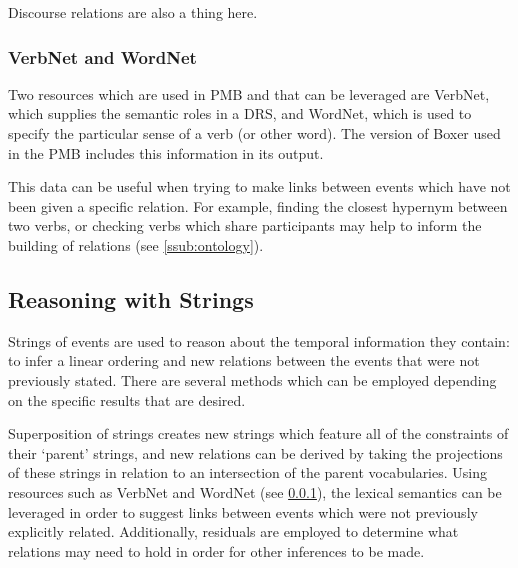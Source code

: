 \documentclass[a4paper,12pt,leqno]{article}
\begin{document}
Discourse relations are also a thing here.

\subsubsection{VerbNet and WordNet}\label{ssub:verbwordnet}
Two resources which are used in PMB and that can be leveraged are VerbNet, which supplies the semantic roles in a DRS, and WordNet, which is used to specify the particular sense of a verb (or other word). The version of Boxer used in the PMB includes this information in its output.

This data can be useful when trying to make links between events which have not been given a specific relation. For example, finding the closest hypernym between two verbs, or checking verbs which share participants may help to inform the building of relations (see \cref{ssub:ontology}).

\subsection{Reasoning with Strings}\label{sub:reasoning}
Strings of events are used to reason about the temporal information they contain: to infer a linear ordering and new relations between the events that were not previously stated. There are several methods which can be employed depending on the specific results that are desired.

Superposition of strings creates new strings which feature all of the constraints of their `parent' strings, and new relations can be derived by taking the projections of these strings in relation to an intersection of the parent vocabularies. Using resources such as VerbNet and WordNet (see \cref{ssub:verbwordnet}), the lexical semantics can be leveraged in order to suggest links between events which were not previously explicitly related. Additionally, residuals are employed to determine what relations may need to hold in order for other inferences to be made.
\end{document}
